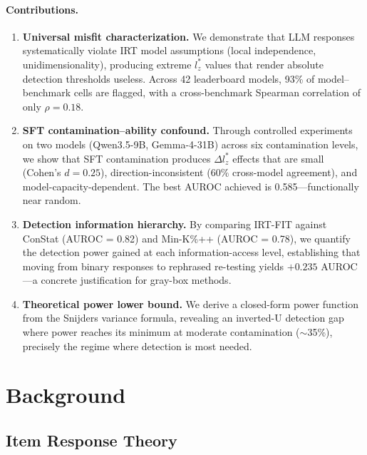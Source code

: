 \documentclass[11pt]{article}
\begin{document}
\paragraph{Contributions.}
\begin{enumerate}
    \item \textbf{Universal misfit characterization.} We demonstrate that LLM responses systematically violate IRT model assumptions (local independence, unidimensionality), producing extreme $l_z^*$ values that render absolute detection thresholds useless. Across 42 leaderboard models, 93\% of model--benchmark cells are flagged, with a cross-benchmark Spearman correlation of only $\rho = 0.18$.

    \item \textbf{SFT contamination--ability confound.} Through controlled experiments on two models (Qwen3.5-9B, Gemma-4-31B) across six contamination levels, we show that SFT contamination produces $\Delta l_z^*$ effects that are small (Cohen's $d = 0.25$), direction-inconsistent (60\% cross-model agreement), and model-capacity-dependent. The best AUROC achieved is 0.585---functionally near random.

    \item \textbf{Detection information hierarchy.} By comparing IRT-FIT against ConStat (AUROC = 0.82) and Min-K\%++ (AUROC = 0.78), we quantify the detection power gained at each information-access level, establishing that moving from binary responses to rephrased re-testing yields $+0.235$ AUROC---a concrete justification for gray-box methods.

    \item \textbf{Theoretical power lower bound.} We derive a closed-form power function from the Snijders variance formula, revealing an inverted-U detection gap where power reaches its minimum at moderate contamination ($\sim$35\%), precisely the regime where detection is most needed.
\end{enumerate}

\section{Background}

\subsection{Item Response Theory}
\end{document}

